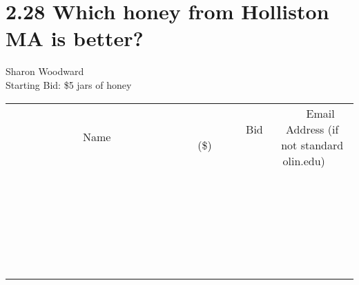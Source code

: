 \documentclass[11pt]{article}
\begin{document}
\section*{2.28 Which honey from Holliston MA is better?}
Sharon Woodward
\\
Starting Bid: \$5
 jars of honey
\\[6ex]
\begin{tabular}{c c c}
~~~~~~~~~~~~~Name~~~~~~~~~~~~~ & ~~~~~~~~~Bid (\$)~~~~~~~~~  & ~~~Email Address (if not standard olin.edu)~~~\\
 & & \\
\hline
 & & \\
\hline
 & & \\
\hline
 & & \\
\hline
 & & \\
\hline
 & & \\
\hline
 & & \\
\hline
 & & \\
\hline
 & & \\
\hline
 & & \\
\hline
 & & \\
\hline
 & & \\
\hline
 & & \\
\hline
 & & \\
\hline
 & & \\
\hline
 & & \\
\hline
 & & \\
\hline
 & & \\
\hline
 & & \\
\hline
 & & \\
\hline
 & & \\
\hline
 & & \\
\hline
 & & \\
\hline
 & & \\
\hline
 & & \\
\hline
 & & \\
\hline
\end{tabular}
\newpage
\end{document}
